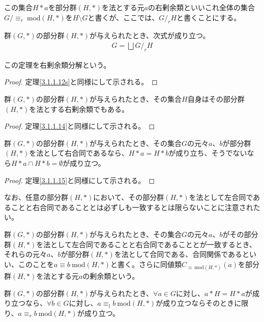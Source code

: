 \documentclass[dvipdfmx]{jsarticle}
\begin{document}
\begin{dfn}
この集合$H*a$を部分群$(H,*)$を法とする元$a$の右剰余類といいこれ全体の集合${G}/{\equiv_{r}\ \mathrm{mod}(H,*)}$を$H\setminus G$と書くが、ここでは、${G}/_r {H}$と書くことにする。
\begin{thm}[右剰余類分解]\label{3.1.1.16s}
群$(G,*)$の部分群$(H,*)$が与えられたとき、次式が成り立つ。
\begin{align*}
G=\bigsqcup G/_r H
\end{align*}\par
この定理を右剰余類分解という。
\end{thm}
\begin{proof} 定理\ref{3.1.1.12s}と同様にして示される。
\end{proof}
\begin{thm}\label{3.1.1.18}
群$(G,*)$の部分群$(H,*)$が与えられたとき、その集合$H$自身はその部分群$(H,*)$を法とする右剰余類でもある。
\end{thm}
\begin{proof} 定理\ref{3.1.1.14}と同様にして示される。
\end{proof}
\begin{thm}\label{3.1.1.19}
群$(G,*)$の部分群$(H,*)$が与えられたとき、その集合$G$の元々$a$、$b$が部分群$(H,*)$を法として右合同であるなら、$H*a = H*b$が成り立ち、そうでないなら$H*a \cap H*b = \emptyset $が成り立つ。
\end{thm}
\begin{proof} 定理\ref{3.1.1.15}と同様にして示される。
\end{proof}\par
なお、任意の部分群$(H,*)$において、その部分群$(H,*)$を法として左合同であることと右合同であることとは必ずしも一致するとは限らないことに注意されたい。
\begin{dfn}
群$(G,*)$の部分群$(H,*)$が与えられたとき、その集合$G$の元々$a$、$b$がその部分群$(H,*)$を法として左合同であることと右合同であることとが一致するとき、それらの元々$a$、$b$が部分群$(H,*)$を法として合同である、合同関係であるといい、このことを$a \equiv b\ \mathrm{mod}(H,*)$と書く。さらに同値類$C_{\equiv \ \mathrm{mod}(H,*)}(a)$を部分群$(H,*)$を法とする元$a$の剰余類という。
\end{dfn}
\begin{thm}\label{3.1.1.20}
群$(G,*)$の部分群$(H,*)$が与えられたとき、$\forall a \in G$に対し、$a*H = H*a$が成り立つなら、$\forall b \in G$に対し、$a \equiv_{l}b\ \mathrm{mod}(H,*)$が成り立つならそのときに限り、$a \equiv_{r}b\ \mathrm{mod}(H,*)$が成り立つ。
\end{thm}

\end{dfn}
\end{document}
